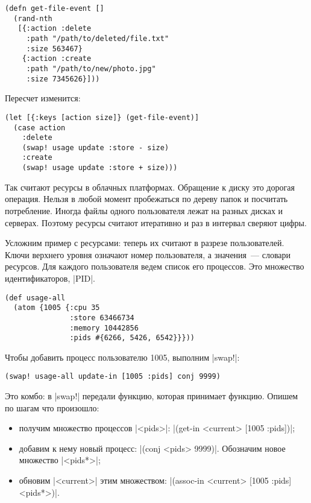 \begin{verbatim}
(defn get-file-event []
  (rand-nth
   [{:action :delete
     :path "/path/to/deleted/file.txt"
     :size 563467}
    {:action :create
     :path "/path/to/new/photo.jpg"
     :size 7345626}]))
\end{verbatim}

\noindent
Пересчет изменится:

\begin{verbatim}
(let [{:keys [action size]} (get-file-event)]
  (case action
    :delete
    (swap! usage update :store - size)
    :create
    (swap! usage update :store + size)))
\end{verbatim}

Так считают ресурсы в облачных платформах. Обращение к диску это дорогая
операция. Нельзя в любой момент пробежаться по дереву папок и посчитать
потребление. Иногда файлы одного пользователя лежат на разных дисках и
серверах. Поэтому ресурсы считают итеративно и раз в интервал сверяют цифры.

Усложним пример с ресурсами: теперь их считают в разрезе пользователей. Ключи
верхнего уровня означают номер пользователя, а значения~--- словари
ресурсов. Для каждого пользователя ведем список его процессов. Это множество
идентификаторов, \spverb|PID|.

\begin{verbatim}
(def usage-all
  (atom {1005 {:cpu 35
               :store 63466734
               :memory 10442856
               :pids #{6266, 5426, 6542}}}))
\end{verbatim}

Чтобы добавить процесс пользователю 1005, выполним \spverb|swap!|:

\begin{verbatim}
(swap! usage-all update-in [1005 :pids] conj 9999)
\end{verbatim}


Это комбо: в \spverb|swap!| передали функцию, которая принимает функцию. Опишем
по шагам что произошло:

\begin{itemize}

\item
  получим множество процессов \spverb|<pids>|: \spverb|(get-in <current> [1005 :pids])|;

\item
  добавим к нему новый процесс: \spverb|(conj <pids> 9999)|. Обозначим новое
  множество \spverb|<pids*>|;

\item
  обновим \spverb|<current>| этим множеством: \spverb|(assoc-in <current> [1005 :pids] <pids*>)|.

\end{itemize}

